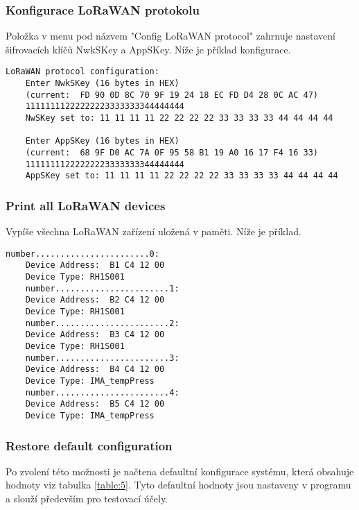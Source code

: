 \subsubsection{Konfigurace LoRaWAN protokolu}
Položka v menu pod názvem "Config LoRaWAN protocol" zahrnuje nastavení šifrovacích klíčů NwkSKey a AppSKey. Níže je příklad konfigurace.

\begin{lstlisting}[style=log]    
    LoRaWAN protocol configuration:
    Enter NwkSKey (16 bytes in HEX)
    (current:  FD 90 0D 8C 70 9F 19 24 18 EC FD D4 28 0C AC 47)
    11111111222222223333333344444444
    NwSKey set to: 11 11 11 11 22 22 22 22 33 33 33 33 44 44 44 44

    Enter AppSKey (16 bytes in HEX)
    (current:  68 9F D0 AC 7A 0F 95 58 B1 19 A0 16 17 F4 16 33)
    11111111222222223333333344444444
    AppSKey set to: 11 11 11 11 22 22 22 22 33 33 33 33 44 44 44 44
\end{lstlisting}


\subsubsection{Print all LoRaWAN devices}
Vypíše všechna LoRaWAN zařízení uložená v paměti. Níže je příklad.


\begin{lstlisting}[style=log]    
    number.......................0:
    Device Address:  B1 C4 12 00
    Device Type: RH1S001
    number.......................1:
    Device Address:  B2 C4 12 00
    Device Type: RH1S001
    number.......................2:
    Device Address:  B3 C4 12 00
    Device Type: RH1S001
    number.......................3:
    Device Address:  B4 C4 12 00
    Device Type: IMA_tempPress
    number.......................4:
    Device Address:  B5 C4 12 00
    Device Type: IMA_tempPress
\end{lstlisting}



\subsubsection{Restore default configuration}
Po zvolení této možnosti je načtena defaultní konfigurace systému, která obsahuje hodnoty viz tabulka \ref{table:5}. Tyto defaultní hodnoty jsou nastaveny v programu a slouží především pro testovací účely.

